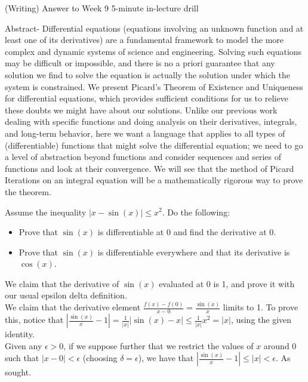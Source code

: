 \documentclass[11 pt]{article}
\begin{document}
\pagebreak
\begin{problem}
	(Writing) Answer to Week 9 5-minute in-lecture drill
\end{problem}
\begin{solution}
	Abstract- Differential equations (equations involving an unknown function and at least one of its derivatives) are a fundamental framework to model the more complex and dynamic systems of science and engineering. Solving such equations may be difficult or impossible, and there is no a priori guarantee that any solution we find to solve the equation is actually the solution under which the system is constrained.
	We present Picard’s Theorem of Existence and Uniqueness for differential equations, which provides sufficient conditions for us to relieve these doubts we might have about our solutions.
	Unlike our previous work dealing with specific functions and doing analysis on their derivatives, integrals, and long-term behavior, here we want a language that applies to all types of (differentiable) functions that might solve the differential equation; we need to go a level of abstraction beyond functions and consider sequences and series of functions and look at their convergence.
We will see that the method of Picard Iterations on an integral equation will be a mathematically rigorous way to prove the theorem.
\end{solution}
\pagebreak
\begin{problem}
	Assume the inequality $|x-\sin(x)|\leq x^2$. Do the following:
	\begin{itemize}
		\item Prove that $\sin(x)$ is differentiable at 0 and find the derivative at 0.
		\item Prove that $\sin(x)$ is differentiable everywhere and that its derivative is $\cos(x)$.
	\end{itemize}
\end{problem}
\begin{solution}
	We claim that the derivative of $\sin(x)$ evaluated at 0 is 1, and prove it with our usual epsilon delta definition.\\
	We claim that the derivative element $\frac{f(x)-f(0)}{x-0}=\frac{\sin(x)}{x}$ limits to 1. To prove this, notice that $|\frac{\sin(x)}{x}-1|=\frac{1}{|x|}|\sin(x)-x|\leq\frac{1}{|x|}x^2=|x|$, using the given identity.\\
	Given any $\epsilon>0$,  if we suppose further that we restrict the values of $x$ around 0 such that $|x-0|<\epsilon$ (choosing $\delta=\epsilon$), we have that $|\frac{\sin(x)}{x}-1|\leq|x|<\epsilon$. As sought.
\end{solution}
\end{document}
